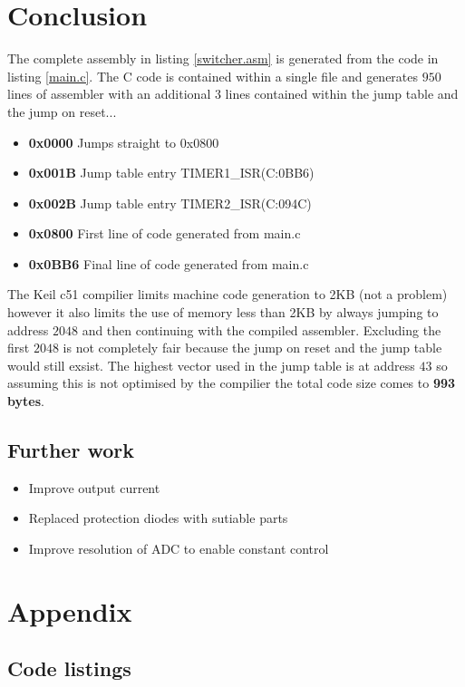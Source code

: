 \documentclass[12pt]{article}%
\begin{document}
\section{Conclusion}

The complete assembly in listing \ref{switcher.asm} is generated from the code in listing \ref{main.c}. The C code is contained within a single file and generates $950$ lines of assembler with an additional $3$ lines contained within the jump table and the jump on reset...

\begin{itemize}
  	\item \textbf{0x0000} Jumps straight to 0x0800
	\item \textbf{0x001B} Jump table entry TIMER1\_ISR(C:0BB6)
	\item \textbf{0x002B} Jump table entry TIMER2\_ISR(C:094C)
	\item \textbf{0x0800} First line of code generated from main.c
  	\item \textbf{0x0BB6} Final line of code generated from main.c
\end{itemize}

The Keil c51 compilier limits machine code generation to 2KB (not a problem) however it also limits the use of memory less than 2KB by always jumping to address $2048$ and then continuing with the compiled assembler. Excluding the first $2048$ is not completely fair because the jump on reset and the jump table would still exsist. The highest vector used in the jump table is at address $43$ so assuming this is not optimised by the compilier the total code size comes to \textbf{993 bytes}.

\subsection{Further work}

\begin{itemize}
  	\item Improve output current
	\item Replaced protection diodes with sutiable parts
	\item Improve resolution of ADC to enable constant control
\end{itemize}

\section{Appendix}

\subsection{Code listings}
\end{document}
